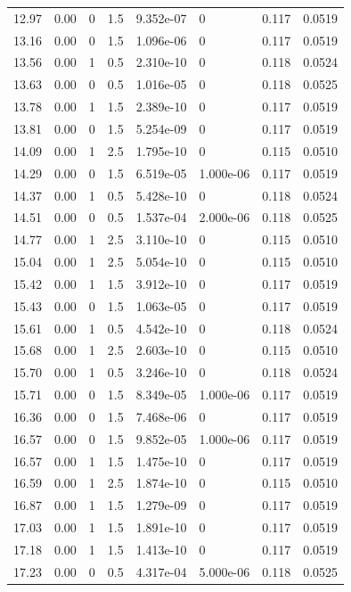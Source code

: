 \documentclass[preview]{standalone}
\begin{document}
{{{\begin{tabular}{L{1.2cm}C{1.2cm} C{0.3cm}C{0.5cm} C{1.4cm}C{1.4cm} C{1.4cm}C{1.4cm}}
  12.97  &  0.00  & 0     & 1.5 &  9.352e-07  & 0  & 0.117 &  0.0519   \\ 
  13.16  &  0.00  & 0     & 1.5 &  1.096e-06  & 0  & 0.117 &  0.0519   \\ 
  13.56  &  0.00  & 1     & 0.5 &  2.310e-10  & 0  & 0.118 &  0.0524   \\ 
  13.63  &  0.00  & 0     & 0.5 &  1.016e-05  & 0  & 0.118 &  0.0525   \\ 
  13.78  &  0.00  & 1     & 1.5 &  2.389e-10  & 0  & 0.117 &  0.0519   \\ 
  13.81  &  0.00  & 0     & 1.5 &  5.254e-09  & 0  & 0.117 &  0.0519   \\ 
  14.09  &  0.00  & 1     & 2.5 &  1.795e-10  & 0  & 0.115 &  0.0510   \\ 
  14.29  &  0.00  & 0     & 1.5 &  6.519e-05  & 1.000e-06  & 0.117 &  0.0519   \\ 
  14.37  &  0.00  & 1     & 0.5 &  5.428e-10  & 0  & 0.118 &  0.0524   \\ 
  14.51  &  0.00  & 0     & 0.5 &  1.537e-04  & 2.000e-06  & 0.118 &  0.0525   \\ 
  14.77  &  0.00  & 1     & 2.5 &  3.110e-10  & 0  & 0.115 &  0.0510   \\ 
  15.04  &  0.00  & 1     & 2.5 &  5.054e-10  & 0  & 0.115 &  0.0510   \\ 
  15.42  &  0.00  & 1     & 1.5 &  3.912e-10  & 0  & 0.117 &  0.0519   \\ 
  15.43  &  0.00  & 0     & 1.5 &  1.063e-05  & 0  & 0.117 &  0.0519   \\ 
  15.61  &  0.00  & 1     & 0.5 &  4.542e-10  & 0  & 0.118 &  0.0524   \\ 
  15.68  &  0.00  & 1     & 2.5 &  2.603e-10  & 0  & 0.115 &  0.0510   \\ 
  15.70  &  0.00  & 1     & 0.5 &  3.246e-10  & 0  & 0.118 &  0.0524   \\ 
  15.71  &  0.00  & 0     & 1.5 &  8.349e-05  & 1.000e-06  & 0.117 &  0.0519   \\ 
  16.36  &  0.00  & 0     & 1.5 &  7.468e-06  & 0  & 0.117 &  0.0519   \\ 
  16.57  &  0.00  & 0     & 1.5 &  9.852e-05  & 1.000e-06  & 0.117 &  0.0519   \\ 
  16.57  &  0.00  & 1     & 1.5 &  1.475e-10  & 0  & 0.117 &  0.0519   \\ 
  16.59  &  0.00  & 1     & 2.5 &  1.874e-10  & 0  & 0.115 &  0.0510   \\ 
  16.87  &  0.00  & 1     & 1.5 &  1.279e-09  & 0  & 0.117 &  0.0519   \\ 
  17.03  &  0.00  & 1     & 1.5 &  1.891e-10  & 0  & 0.117 &  0.0519   \\ 
  17.18  &  0.00  & 1     & 1.5 &  1.413e-10  & 0  & 0.117 &  0.0519   \\ 
  17.23  &  0.00  & 0     & 0.5 &  4.317e-04  & 5.000e-06  & 0.118 &  0.0525   \\ 
\hline 
\end{tabular} 

}}}
\end{document}

